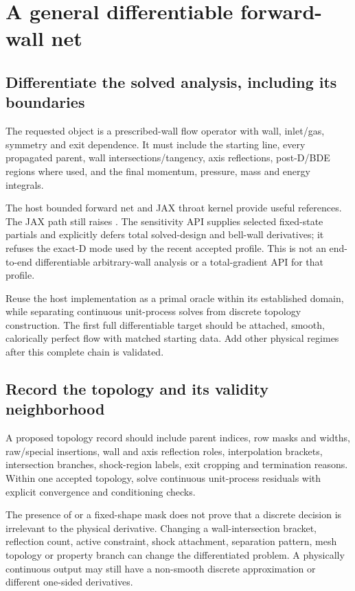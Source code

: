 \section{A general differentiable forward-wall net}
\label{sec:ad}
\subsection{Differentiate the solved analysis, including its boundaries}
The requested object is a prescribed-wall flow operator with wall,
inlet/gas, symmetry and exit dependence. It must include the starting
line, every propagated parent, wall intersections/tangency, axis
reflections, post-D/BDE regions where used, and the final momentum,
pressure, mass and energy integrals.

\current The host bounded forward net and JAX throat kernel provide
useful references. The JAX  path still raises
. The sensitivity API supplies selected
fixed-state partials and explicitly defers total solved-design and
bell-wall derivatives; it refuses the exact-D mode used by the recent
accepted profile. This is not an end-to-end differentiable arbitrary-wall
analysis or a total-gradient API for that profile.

\proposal Reuse the host implementation as a primal oracle within its
established domain, while separating continuous unit-process solves
from discrete topology construction. The first full differentiable
target should be attached, smooth, calorically perfect flow with
matched starting data. Add other physical regimes after this complete
chain is validated.

\subsection{Record the topology and its validity neighborhood}
A proposed topology record should include parent indices, row masks and
widths, raw/special insertions, wall and axis reflection roles, interpolation
brackets, intersection branches, shock-region labels, exit cropping and
termination reasons. Within one accepted topology, solve continuous
unit-process residuals with explicit convergence and conditioning checks.

The presence of  or a fixed-shape mask does not prove
that a discrete decision is irrelevant to the physical derivative.
Changing a wall-intersection bracket, reflection count, active constraint,
shock attachment, separation pattern, mesh topology or property branch
can change the differentiated problem. A physically continuous output
may still have a non-smooth discrete approximation or different one-sided
derivatives.

